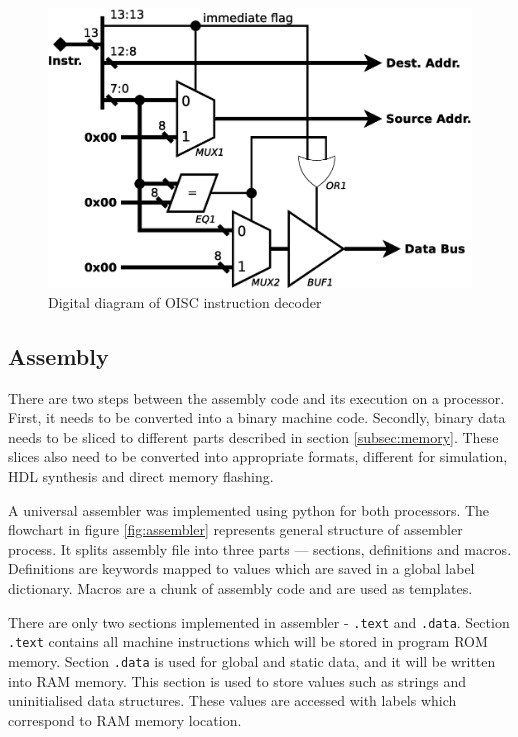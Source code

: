 \begin{figure}
	\centering
	\includegraphics[scale=0.4]{../resources/oisc_decoder.eps}
	\caption{Digital diagram of OISC instruction decoder}
	\label{fig:oisc_decoder}
\end{figure}

\subsection{Assembly}\label{subsec:assembly}
There are two steps between the assembly code and its execution on a processor. First, it needs to be converted into a binary machine code. Secondly, binary data needs to be sliced to different parts described in section \ref{subsec:memory}. These slices also need to be converted into appropriate formats, different for simulation, HDL synthesis and direct memory flashing. 

A universal assembler was implemented using python for both processors. The flowchart in figure \ref{fig:assembler} represents general structure of assembler process. It splits assembly file into three parts — sections, definitions and macros. Definitions are keywords mapped to values which are saved in a global label dictionary. Macros are a chunk of assembly code and are used as templates. 

There are only two sections implemented in assembler - \texttt{.text} and \texttt{.data}. Section \texttt{.text} contains all machine instructions which will be stored in program ROM memory. Section \texttt{.data} is used for global and static data, and it will be written into RAM memory. This section is used to store values such as strings and uninitialised data structures. These values are accessed with labels which correspond to RAM memory location. 

